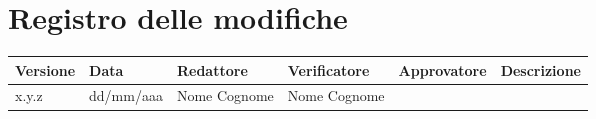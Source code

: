 
\section*{Registro delle modifiche}

\renewcommand{\arraystretch}{1.5}
\scriptsize
\begin{tabularx}{\textwidth}{lllllX}
	\textbf{Versione} & \textbf{Data} & \textbf{Redattore}  & \textbf{Verificatore}  & \textbf{Approvatore} & \textbf{Descrizione}  \\
	\hline
	x.y.z			  & dd/mm/aaa    & Nome Cognome	        & Nome Cognome           & 		 			   	&                       \\
	\hline
\end{tabularx}
